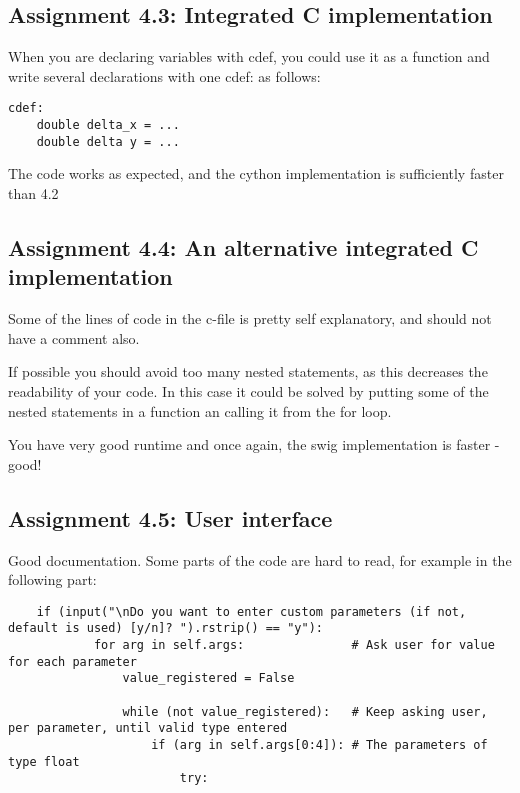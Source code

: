\documentclass[a4paper]{article}
\begin{document}
\subsection*{Assignment 4.3: Integrated C implementation}

When you are declaring variables with cdef, you could use it as a function and write several declarations with one cdef: as follows:

\begin{verbatim}
cdef:
	double delta_x = ...
	double delta y = ...
\end{verbatim}

The code works as expected, and the cython implementation is sufficiently faster than 4.2

\subsection*{Assignment 4.4:  An alternative integrated C implementation}

Some of the lines of code in the c-file is pretty self explanatory, and should not have a comment also.

If possible you should avoid too many nested statements, as this decreases the readability of your code. In this case it could be solved by putting some of the nested statements in a function an calling it from the for loop.

You have very good runtime and once again, the swig implementation is faster - good!

\subsection*{Assignment 4.5: User interface}

Good documentation. Some parts of the code are hard to read, for example in the following part:

\begin{verbatim}
    if (input("\nDo you want to enter custom parameters (if not, default is used) [y/n]? ").rstrip() == "y"):
            for arg in self.args:               # Ask user for value for each parameter
                value_registered = False

                while (not value_registered):   # Keep asking user, per parameter, until valid type entered
                    if (arg in self.args[0:4]): # The parameters of type float
                        try:
\end{verbatim}
\end{document}
